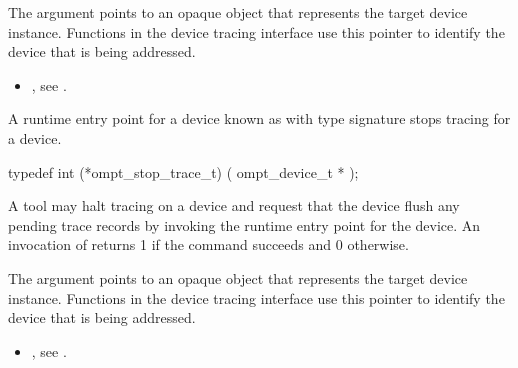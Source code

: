 \argdesc
The  argument points to an opaque object that represents
the target device instance. Functions in the device tracing interface
use this pointer to identify the device that is being addressed.

\crossreferences
\begin{itemize}
\item {},
see .
\end{itemize}

\label{sec:ompt_stop_trace_t}

\summary
A runtime entry point for a device known as 
with type signature 
stops tracing for a device.

\begin{ccppspecific}
\begin{omptInquiry}
typedef int (*ompt_stop_trace_t) (
  ompt_device_t *
);
\end{omptInquiry}
\end{ccppspecific}

\descr

A tool may halt tracing on a device and request that the device flush any pending trace records
by invoking the  runtime entry point for the device.
An invocation of  returns 1 if the command
succeeds and 0 otherwise.

\argdesc
The  argument points to an opaque object that represents
the target device instance. Functions in the device tracing interface
use this pointer to identify the device that is being addressed.



\crossreferences
\begin{itemize}
\item {},
see .
\end{itemize}

